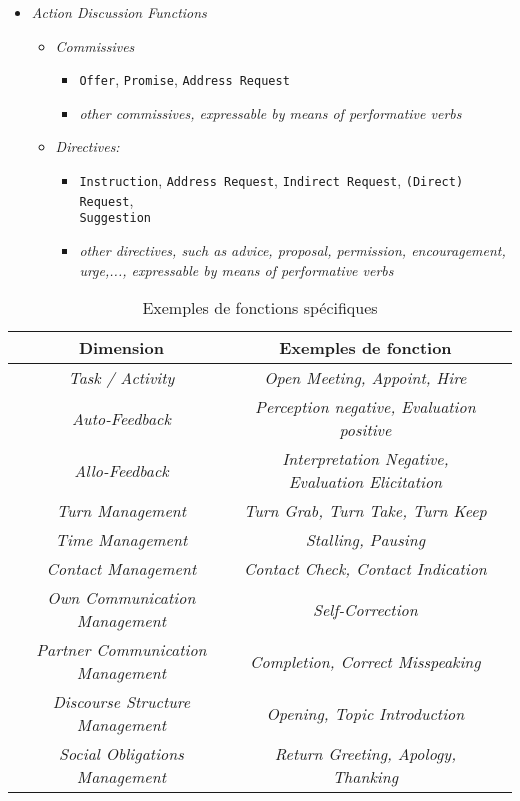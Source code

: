 \documentclass[10pt,a4paper,twoside]{article}
\begin{document}
\begin{itemize}
\begin{itemize}
	\end{itemize}
	\item \textit{Action Discussion Functions}
	\begin{itemize}
		\item \textit{Commissives}
		\begin{itemize}
			\item \texttt{Offer}, \texttt{Promise}, \texttt{Address Request}
			\item \textit{other commissives, expressable by means of performative verbs}
		\end{itemize}
		\item \textit{Directives:}
		\begin{itemize}
			\item \texttt{Instruction}, \texttt{Address Request}, \texttt{Indirect Request}, \texttt{(Direct) Request},\\ \texttt{Suggestion}
			\item \textit{other directives, such as advice, proposal, permission, encouragement, urge,..., expressable by means of performative verbs}
		\end{itemize}
	\end{itemize}
\end{itemize}

\begin{table}
	\centering
	\begin{tabular}{c c c}
		\toprule
		Dimension & Exemples de fonction \\
		\midrule
		\textit{Task / Activity} & \textit{Open Meeting, Appoint, Hire } \\
		\textit{Auto-Feedback} & \textit{Perception negative, Evaluation positive} \\
		\textit{Allo-Feedback} & \textit{Interpretation Negative, Evaluation Elicitation} \\
		\textit{Turn Management} & \textit{Turn Grab, Turn Take, Turn Keep} \\
		\textit{Time Management} & \textit{Stalling, Pausing} \\
		\textit{Contact Management} & \textit{Contact Check, Contact Indication} \\
		\textit{Own Communication Management} & \textit{Self-Correction} \\
		\textit{Partner Communication Management} & \textit{Completion, Correct Misspeaking} \\
		\textit{Discourse Structure Management} & \textit{Opening, Topic Introduction} \\
		\textit{Social Obligations Management} & \textit{Return Greeting, Apology, Thanking} \\
		\bottomrule
	\end{tabular}
	\caption{Exemples de fonctions spécifiques}
	\label{fig:dimensionSpecificFunctions}
\end{table}
\end{document}
